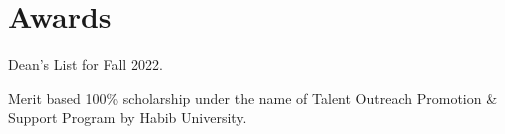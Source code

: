 \documentclass[]{resume}
\begin{document}
\begin{minipage}[t]{0.5\textwidth}



    \section{Awards}
    \sectionsep
    \begin{tightemize}
        \item Dean's List for Fall 2022.
        \item Merit based 100\% scholarship under the name of Talent Outreach Promotion \& Support Program by Habib University.
    \end{tightemize}

\end{minipage}
\end{document}
